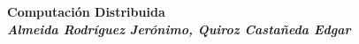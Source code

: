 \documentclass[a4paper,12pt]{article}
\begin{document}
\begin{center}
	\textbf{Computación Distribuida}\\
	\textbf{\textit{Almeida Rodríguez Jerónimo, Quiroz Castañeda Edgar}}
\end{center}
\end{document}
